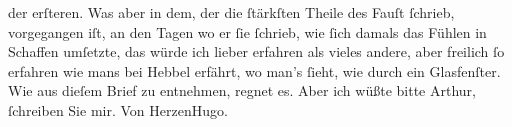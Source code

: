 \begin{ledgroupsized}[t]{13cm}
               der erſteren. Was aber in dem, der die ſtärkſten Theile des Fauſt ſchrieb, vorgegangen iſt, an den Tagen wo er ſie ſchrieb,
               wie ſich damals das Fühlen in Schaffen umſetzte, das würde ich lieber erfahren als
               vieles andere, aber freilich ſo erfahren wie mans bei Hebbel erfährt, wo man’s ſieht, wie durch ein Glasfenſter.\pend
           \pstart
           Wie aus dieſem Brief zu entnehmen, regnet es. Aber ich wüßte \label{T_L01297_1v}\label{T_L01297_1h} bitte Arthur, ſchreiben Sie mir.\pend
           \pstart Von
                  Herzen\spacefill\mbox{Hugo.}\pend{}\endnumbering{}\end{ledgroupsized}  \newcommand{\dateiname}{L01297}\newcommand{\titel}{Hugo von Hofmannsthal an Arthur Schnitzler, 19. 6. [1903]}\newcommand{\editorInnen}{Martin Anton Müller und Gerd-Hermann Susen}
            \footnotesize
\begin{ledgroupsized}[t]{11.5cm}
\end{ledgroupsized}
         
      